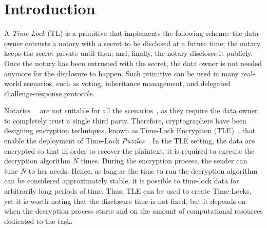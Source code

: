 \section{Introduction}\label{sect:introduction}




A \textit{Time-Lock} (TL) is a primitive that implements the following scheme:
the data owner entrusts a notary with a secret to be disclosed at a
future time; the notary keeps the secret private until then; and,
finally, the notary discloses it publicly. Once the notary has been entrusted with the secret, the data owner is not needed anymore for the disclosure to happen.
Such primitive can be used in many real-world scenarios, such as voting, inheritance management, and delegated challenge-response protocols.

Notaries~\cite{10.1007/BFb0032349}~\cite{rabin2006time} are not
suitable for all the scenarios~\cite{Abelson:1997:RKR:275079.275104},
as they require the data owner to completely trust a single third party.
Therefore, cryptographers have been designing encryption techniques, known as Time-Lock Encryption (TLE)~\cite{may1993timed}, that enable the deployment of Time-Lock {\em Puzzles}~\cite{mahmoody-tl,Bitansky:2016:TPR:2840728.2840745}.
In the TLE setting, the data are encrypted so that in order to recover the plaintext, it is required to execute the decryption algorithm $N$ times.
During the encryption process, the sender can tune $N$ to her needs.
Hence, as long as the time to run the decryption algorithm can be considered approximately stable, it is possible to time-lock data for arbitrarily long periods of time.
Thus, TLE can be used to create Time-Locks, yet it is worth noting
that the disclosure time is not fixed, but it depends on when
the decryption process starts and on the amount of computational resources
dedicated to the task.

